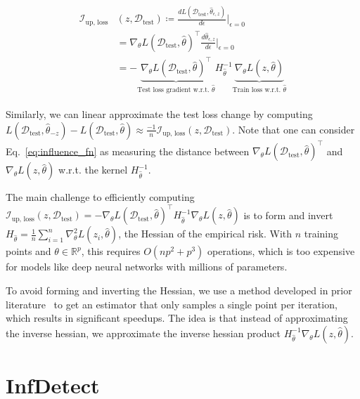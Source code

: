 \begin{align}
\begin{split}
    \mathcal{I}_\text{up, loss}&(z, \mathcal{D}_\text{test}) \coloneqq \frac{d L(\mathcal{D}_\text{test}, \hat{\theta}_{\epsilon, z})}{d \epsilon}\Bigr|_{\epsilon=0} \\ 
    &= \nabla_\theta L(\mathcal{D}_\text{test}, \hat{\theta})^\top \frac{d \hat{\theta}_{\epsilon, z}}{d \epsilon}\Bigr|_{\epsilon=0} \\
    &= -\underbrace{\nabla_\theta L(\mathcal{D}_\text{test}, \hat{\theta})^\top}_{\text{Test loss gradient w.r.t. }\hat{\theta}} H_{\hat{\theta}}^{-1} \underbrace{\nabla_\theta L(z, \hat{\theta})}_{\text{Train loss w.r.t. }\hat{\theta}}
    \label{eq:influence_fn}
\end{split}
\end{align}

\noindent Similarly, we can linear approximate the test loss change by computing $L(\mathcal{D}_\text{test}, \hat{\theta}_{-z}) - L(\mathcal{D}_\text{test}, \hat{\theta}) \approx \frac{-1}{n} \mathcal{I}_\text{up, loss}(z, \mathcal{D}_\text{test})$.
Note that one can consider Eq.~\ref{eq:influence_fn} as measuring the distance between $\nabla_\theta L(\mathcal{D}_\text{test}, \hat{\theta})^\top$ and $\nabla_\theta L(z, \hat{\theta})$ w.r.t. the kernel $H_{\hat{\theta}}^{-1}$.

The main challenge to efficiently computing $\mathcal{I}_\text{up, loss}(z, \mathcal{D}_\text{test})=-\nabla_\theta L(\mathcal{D}_\text{test}, \hat{\theta})^\top H_{\hat{\theta}}^{-1} \nabla_\theta L(z, \hat{\theta})$ 
is to form and invert $H_{\hat{\theta}} = \frac{1}{n} \sum_{i=1}^n \nabla_\theta^2 L(z_i, \hat{\theta})$, the Hessian of the empirical risk.
With $n$ training points and $\theta \in \mathbb{R}^p$, this requires $O(np^2 + p^3)$ operations, which is too expensive for models like deep neural networks with millions of parameters.

To avoid forming and inverting the Hessian, we use a method developed in prior literature~\cite{second-order-approx} to get an estimator that only samples a single point per iteration, which results in significant speedups.
The idea is that instead of approximating the inverse hessian, we approximate the inverse hessian product $H_{\hat{\theta}}^{-1} \nabla_\theta L(z, \hat{\theta})$.

\section{InfDetect}

